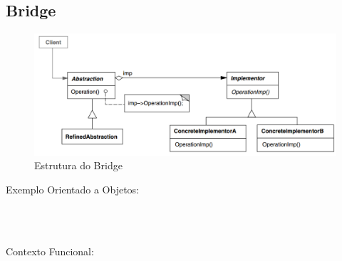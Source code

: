 \subsection{Bridge}

\begin{figure}[htb]
	\caption{\label{fig_grafico}Estrutura do Bridge}
	\begin{center}
	    \includegraphics[scale=0.5]{5_padroes-contexto-funcional/5.2_estruturais/5.2.2_bridge/diagram.png}
	\end{center}
\end{figure}

Exemplo Orientado a Objetos:

\begin{lstlisting}[caption={Bridge Orientado a Objetos},label=oobridge]



\end{lstlisting}

Contexto Funcional:


\begin{lstlisting}[caption={Bridge Funcional},label=fpbridge]
    

    
\end{lstlisting}